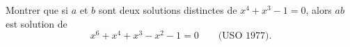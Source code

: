Montrer que si $a$ et $b$ sont deux solutions distinctes de $x^4 + x^3 - 1 = 0$, alors $ab$ est solution de
\[ x^6 + x^4 + x^3 - x^2 - 1 = 0 \qquad \text{(USO 1977).} \]
